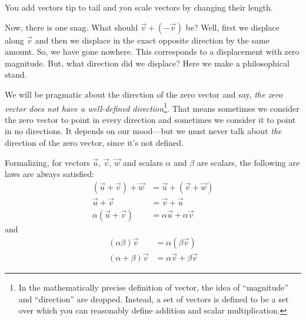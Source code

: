 \begin{center}
	\usetikzlibrary{patterns,decorations.pathreplacing}
\end{center}


\begin{emphbox}[Takeaway]
	You add vectors tip to tail and you scale vectors by changing their length.
\end{emphbox}
Now, there is one snag.  What should $\vec v+(-\vec v)$ be?  Well, first we
displace along $\vec v$ and then we displace in the exact opposite direction
by the same amount.  So, we have gone nowhere.  This corresponds to a displacement
with zero magnitude.  But, what direction did we displace?  Here we make a philosophical
stand.


We will be pragmatic about the direction of the zero vector and say,
\emph{the zero vector does not have a well-defined direction}\footnote{
	In the mathematically precise definition of vector, the idea of ``magnitude''
	and ``direction'' are dropped.  Instead, a set of vectors is defined to be
	a set over which you can reasonably define addition and scalar multiplication.
}.  That means
sometimes we consider the zero vector to point in every direction and sometimes
we consider it to point in no directions.  It depends on our mood---but we must
never talk about \emph{the} direction of the zero vector, since it's not defined.

Formalizing, for vectors $\vec u$, $\vec v$, $\vec w$ and scalars $\alpha$ and $\beta$
are scalars, the
following are laws are always satisfied:
\begin{align*}
	(\vec u+\vec v)+\vec w&=\vec u+(\vec v+\vec w)\tag{Associativity}\\
	\vec u+\vec v&=\vec v+\vec u\tag{Commutativity}\\
	\alpha(\vec u+\vec v)&=\alpha\vec u+\alpha \vec v\tag{Distributivity}
\end{align*}
and
\begin{align*}
	(\alpha\beta)\vec v&=\alpha(\beta \vec v)\tag{Associativity II}\\
	(\alpha+\beta)\vec v&=\alpha\vec v+\beta \vec v\tag{Distributivity II}
\end{align*}

